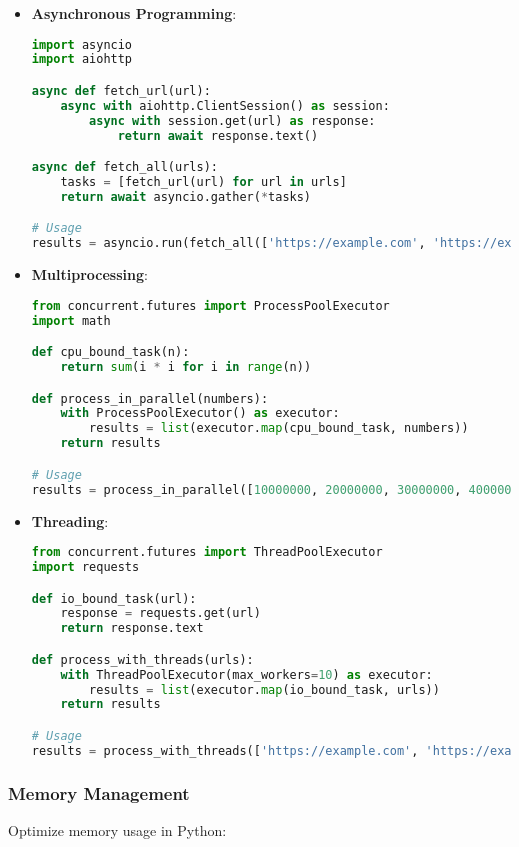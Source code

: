 \begin{itemize}
    \item \textbf{Asynchronous Programming}:
    \begin{lstlisting}[language=python]
import asyncio
import aiohttp

async def fetch_url(url):
    async with aiohttp.ClientSession() as session:
        async with session.get(url) as response:
            return await response.text()

async def fetch_all(urls):
    tasks = [fetch_url(url) for url in urls]
    return await asyncio.gather(*tasks)

# Usage
results = asyncio.run(fetch_all(['https://example.com', 'https://example.org']))
    \end{lstlisting}
    
    \item \textbf{Multiprocessing}:
    \begin{lstlisting}[language=python]
from concurrent.futures import ProcessPoolExecutor
import math

def cpu_bound_task(n):
    return sum(i * i for i in range(n))

def process_in_parallel(numbers):
    with ProcessPoolExecutor() as executor:
        results = list(executor.map(cpu_bound_task, numbers))
    return results

# Usage
results = process_in_parallel([10000000, 20000000, 30000000, 40000000])
    \end{lstlisting}
    
    \item \textbf{Threading}:
    \begin{lstlisting}[language=python]
from concurrent.futures import ThreadPoolExecutor
import requests

def io_bound_task(url):
    response = requests.get(url)
    return response.text

def process_with_threads(urls):
    with ThreadPoolExecutor(max_workers=10) as executor:
        results = list(executor.map(io_bound_task, urls))
    return results

# Usage
results = process_with_threads(['https://example.com', 'https://example.org'])
    \end{lstlisting}
\end{itemize}

\subsubsection{Memory Management}
Optimize memory usage in Python:

